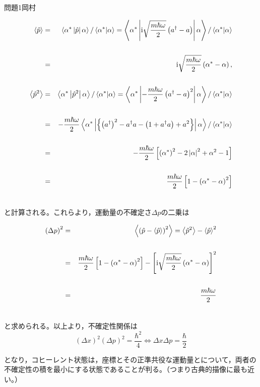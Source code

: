 \documentclass[fleqn]{jbook}
\begin{document}
\begin{answer}{問題1}{岡村}
\begin{enumerate}
\begin{enumerate}
    \begin{eqnarray}
  \left\langle {\hat p} \right\rangle  &=& \left\langle {\alpha ^ *  \left| {\hat p} \right|\alpha } \right\rangle /\left\langle {{\alpha ^ *  }}|{\alpha } \right\rangle  = \left\langle {\alpha ^ *  \left| {{\rm i}\sqrt {\frac{{m\hbar \omega }}{2}} \left( {a^{\dagger}  - a} \right)} \right|\alpha } \right\rangle /\left\langle {{\alpha ^ *  }}|{\alpha } \right\rangle  \cr 
  & & \cr
   &=& {\rm i}\sqrt {\frac{{m\hbar \omega }}{2}} \left( {\alpha ^ *   - \alpha } \right), \\ 
   & & \cr
  \left\langle {\hat p^2 } \right\rangle  &=& \left\langle {\alpha ^ *  \left| {\hat p^2 } \right|\alpha } \right\rangle /\left\langle {{\alpha ^ *  }}|{\alpha } \right\rangle  = \left\langle {\alpha ^ *  \left| { - \frac{{m\hbar \omega }}{2}\left( {a^{\dagger}  - a} \right)^2 } \right|\alpha } \right\rangle /\left\langle {{\alpha ^ *  }}|{\alpha } \right\rangle  \cr 
  & & \cr
   &=&  - \frac{{m\hbar \omega }}{2}\left\langle {\alpha ^ *  \left| {\left\{ {\left( {a^{\dagger} } \right)^2  - a^{\dagger} a - \left( {1 + a^{\dagger} a} \right) + a^2 } \right\}} \right|\alpha } \right\rangle /\left\langle {{\alpha ^ *  }}|{\alpha } \right\rangle  \cr 
   & & \cr
   &=&  - \frac{{m\hbar \omega }}{2}\left[ {\left( {\alpha ^ *  } \right)^2  - 2\left| \alpha  \right|^2  + \alpha ^2  - 1} \right] \cr 
   & & \cr
   &=& \frac{{m\hbar \omega }}{2}\left[ {1 - \left( {\alpha ^ *   - \alpha } \right)^2 } \right] \\\nonumber
    \end{eqnarray}
    
    と計算される。これらより，運動量の不確定さ${\Delta p}$の二乗は
    
    \begin{eqnarray}
 \left( {\Delta p} \right)^2  &=& \left\langle {\left( {\hat p - \left\langle {\hat p} \right\rangle } \right)^2 } \right\rangle = \left\langle {\hat p^2 } \right\rangle  - \left\langle {\hat p} \right\rangle ^2 \cr
 & & \cr
 &=& \frac{{m\hbar \omega }}{2}\left[ {1 - \left( {\alpha ^ *   - \alpha } \right)^2 } \right] - \left[ {\rm i}\sqrt {\frac{{m\hbar \omega }}{2}} \left( {\alpha ^ *   - \alpha } \right) \right]^2 \cr
 & & \cr
 &=&\frac{{m\hbar \omega }}{2}\\\nonumber
 \end{eqnarray}
 
 と求められる。以上より，不確定性関係は
 \begin{equation}
\left( {\Delta x} \right)^2 \left( {\Delta p} \right)^2  = \frac{{\hbar ^2 }}{4} 
\iff \Delta x\Delta p = \frac{\hbar }{2} 
 \end{equation}
 
 となり，コヒーレント状態は，座標とその正準共役な運動量とについて，両者の不確定性の積を最小にする状態であることが判る。（つまり古典的描像に最も近い。）\\
 
  \end{enumerate}
  
\end{enumerate}

\end{answer}
\end{document}

